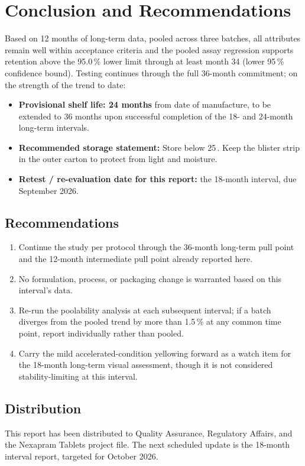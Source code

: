 \section{Conclusion and Recommendations}

\begin{shelflifebox}
Based on 12 months of long-term data, pooled across three batches, all attributes
remain well within acceptance criteria and the pooled assay regression supports
retention above the 95.0\,\% lower limit through at least month 34 (lower 95\,\%
confidence bound). Testing continues through the full 36-month commitment; on the
strength of the trend to date:
\begin{itemize}
  \item \textbf{Provisional shelf life: 24 months} from date of manufacture, to be
        extended to 36 months upon successful completion of the 18- and 24-month
        long-term intervals.
  \item \textbf{Recommended storage statement:} Store below 25\,\degC. Keep the
        blister strip in the outer carton to protect from light and moisture.
  \item \textbf{Retest / re-evaluation date for this report:} the 18-month interval,
        due September 2026.
\end{itemize}
\end{shelflifebox}

\subsection{Recommendations}
\begin{enumerate}
  \item Continue the study per protocol through the 36-month long-term pull point and
        the 12-month intermediate pull point already reported here.
  \item No formulation, process, or packaging change is warranted based on this
        interval's data.
  \item Re-run the poolability analysis at each subsequent interval; if a batch
        diverges from the pooled trend by more than 1.5\,\% at any common time point,
        report individually rather than pooled.
  \item Carry the mild accelerated-condition yellowing forward as a watch item for the
        18-month long-term visual assessment, though it is not considered
        stability-limiting at this interval.
\end{enumerate}

\subsection{Distribution}
This report has been distributed to Quality Assurance, Regulatory Affairs, and the
Nexapram Tablets project file. The next scheduled update is the 18-month interval
report, targeted for October 2026.
